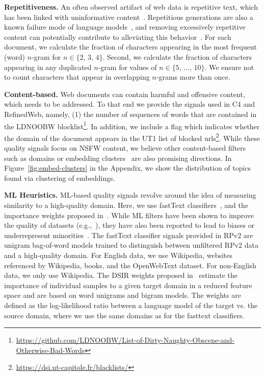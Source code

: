 \documentclass{article}
\begin{document}
{\bf Repetitiveness.} An often observed artifact of web data is repetitive text, which has been linked with uninformative content~\cite{rae2021scaling}. 
Repetitious generations are also a known failure mode of language models~\cite{holtzman2019curious}, and removing excessively repetitive content can potentially contribute to alleviating this behavior~\cite{rae2021scaling}. For each document, we calculate the fraction of characters appearing in the most frequent (word) $n$-gram for $n\in\{2,\,3,\,4\}$. Second, we calculate the fraction of characters appearing in any duplicated $n$-gram for values of $n\in\{5,\,\ldots,\,10\}$. We ensure not to count characters that appear in overlapping $n$-grams more than once.

{\bf Content-based.} Web documents can contain harmful and offensive content, which needs to be addressed. To that end we provide the signals used in C4 and RefinedWeb, namely, (1) the number of sequences of words that are contained in the LDNOOBW blocklist\footnote{\url{https://github.com/LDNOOBW/List-of-Dirty-Naughty-Obscene-and-Otherwise-Bad-Words}}. In addition, we include a flag which indicates whether the domain of the document appears in the UT1 list of blocked urls\footnote{\url{https://dsi.ut-capitole.fr/blacklists/}}. While these quality signals focus on NSFW content, we believe other content-based filters such as domains or embedding clusters~\cite{tirumala2024d4} are also promising directions. In Figure~\ref{fig:embed-clusters} in the Appendix, we show the distribution of topics found via clustering of embeddings.

{\bf ML Heuristics.} ML-based quality signals revolve around the idea of measuring similarity to a high-quality domain. Here, we use fastText classifiers~\cite{joulin2017bag}, and the importance weights proposed in~\cite{xie2023data}. While ML filters have been shown to improve the quality of datasets (e.g.,~\cite{chowdhery2023palm,touvron2023allama,brown2020language}), they have also been reported to lead to biases or underrepresent minorities~\cite{dodge2021documenting}. The fastText classifier signals provided in RPv2 are unigram bag-of-word models trained to distinguish between unfiltered RPv2 data and a high-quality domain. For English data, we use Wikipedia, websites referenced by Wikipedia, books, and the OpenWebText dataset. For non-English data, we only use Wikipedia. The DSIR weights proposed in~\cite{xie2023data} estimate the importance of individual samples to a given target domain in a reduced feature space and are based on word unigrams and bigram models. The weights are defined as the log-likelihood ratio between a language model of the target vs. the source domain, where we use the same domains as for the fasttext classifiers.
\end{document}
